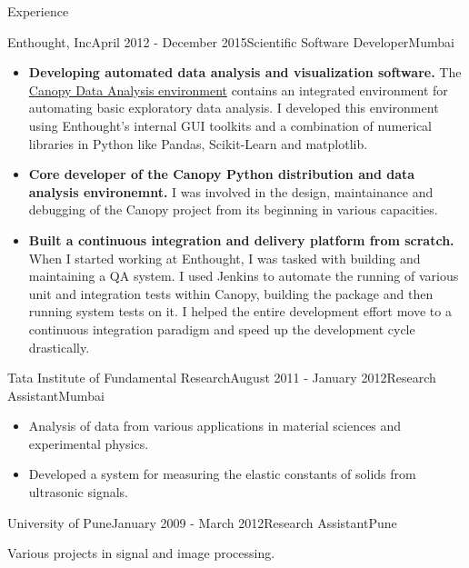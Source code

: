 \documentclass{resume} %
\begin{document}
\begin{rSection}{Experience}
\begin{rSubsection}{Enthought, Inc}{April 2012 - December 2015}{Scientific
    Software Developer}{Mumbai}
\begin{itemize}
\item \textbf{Developing automated data analysis and visualization software.}
    The \href{https://www.enthought.com/products/canopy/}{Canopy Data Analysis environment} contains an
    integrated environment for automating basic exploratory data analysis. I
    developed this environment using Enthought's internal GUI toolkits and a
    combination of numerical libraries in Python like Pandas, Scikit-Learn and
    matplotlib.
\item \textbf{Core developer of the Canopy Python distribution and data analysis environemnt.}
    I was involved in the design, maintainance and debugging of the Canopy
    project from its beginning in various capacities.
\item \textbf{Built a continuous integration and delivery platform from scratch.}
    When I started working at Enthought, I was tasked with building and
    maintaining a QA system. I used Jenkins to automate the running of various
    unit and integration tests within Canopy, building the package and then
    running system tests on it. I helped the entire development effort move to
    a continuous integration paradigm and speed up the development cycle
    drastically.
\end{itemize}
\end{rSubsection}

\begin{rSubsection}{Tata Institute of Fundamental Research}{August 2011 -
    January 2012}{Research Assistant}{Mumbai}
\begin{itemize}
\item Analysis of data from various applications in material sciences and
    experimental physics.
\item Developed a system for measuring the elastic constants of solids from
    ultrasonic signals.
\end{itemize}
\end{rSubsection}

\begin{rSubsection}{University of Pune}{January 2009 - March 2012}{Research
    Assistant}{Pune}
\item Various projects in signal and image processing.
\end{rSubsection}


\end{rSection}
\end{document}
